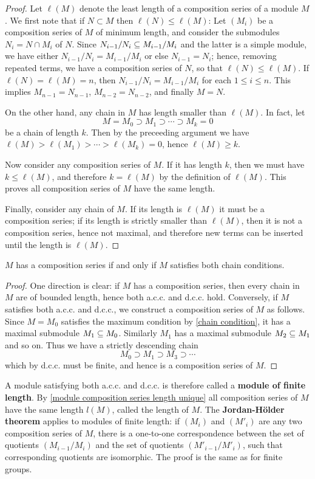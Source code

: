 \begin{proof}
Let $\ell(M)$ denote the least length of a composition series of a module $M$. We first note that if $N\subset M$ then $\ell(N)\leq\ell(M)$: Let $(M_i)$ be a composition series of $M$ of minimum length, and consider the submodules $N_i=N\cap M_i$ of $N$. Since $N_{i-1}/N_i\subseteq M_{i-1}/M_i$ and the latter is a simple module, we have either $N_{i-1}/N_i=M_{i-1}/M_i$ or else $N_{i-1}=N_i$; hence, removing repeated terms, we have a composition series of $N$, so that $\ell(N)\leq \ell(M)$. If $\ell(N)=\ell(M)=n$, then $N_{i-1}/N_i=M_{i-1}/M_i$ for each $1\leq i\leq n$. This implies $M_{n-1}=N_{n-1}$, $M_{n-2}=N_{n-2}$, and finally $M=N$.\par
On the other hand, any chain in $M$ has length smaller than $\ell(M)$. In fact, let 
\[M=M_0\supset M_1\supset\cdots\supset M_k=0\]
be a chain of length $k$. Then by the preceeding argument we have $\ell(M)>\ell(M_1)>\cdots>\ell(M_k)=0$, hence $\ell(M)\geq k$.\par
Now consider any composition series of $M$. If it has length $k$, then we must have $k\leq\ell(M)$, and therefore $k=\ell(M)$ by the definition of $\ell(M)$. This proves all composition series of $M$ have the same length.\par
Finally, consider any chain of $M$. If its length is $\ell(M)$ it must be a composition series; if its length is strictly smaller than $\ell(M)$, then it is not a composition series, hence not maximal, and therefore new terms can be inserted until the length is $\ell(M)$.
\end{proof}
\begin{proposition}\label{module composition series exist iff acc dcc}
$M$ has a composition series if and only if $M$ satisfies both chain conditions.
\end{proposition}
\begin{proof}
One direction is clear: if $M$ has a composition series, then every chain in $M$ are of bounded length, hence both a.c.c. and d.c.c. hold. Conversely, if $M$ satisfies both a.c.c. and d.c.c., we construct a composition series of $M$ as follows. Since $M=M_0$ satisfies the maximum condition by \cref{chain condition}, it has a maximal submodule $M_1\subseteq M_0$. Similarly $M_1$ has a maximal submodule $M_2\subseteq M_1$ and so on. Thus we have a strictly descending chain 
\[M_0\supset M_1\supset M_3\supset\cdots\]
which by d.c.c. must be finite, and hence is a composition series of $M$.
\end{proof}
A module satisfying both a.c.c. and d.c.c. is therefore called a \textbf{module of finite length}. By \cref{module composition series length unique} all composition series of $M$ have the same length $l(M)$, called the length of $M$. The \textbf{Jordan-H\"older theorem} applies to modules of finite length: if $(M_i)$ and $(M'_i)$ are any two composition series of $M$, there is a one-to-one correspondence between the set of quotients $(M_{i-1}/M_i)$ and the set of quotients $(M'_{i-1}/M'_i)$, such that corresponding quotients are isomorphic. The proof is the same as for finite groups.

